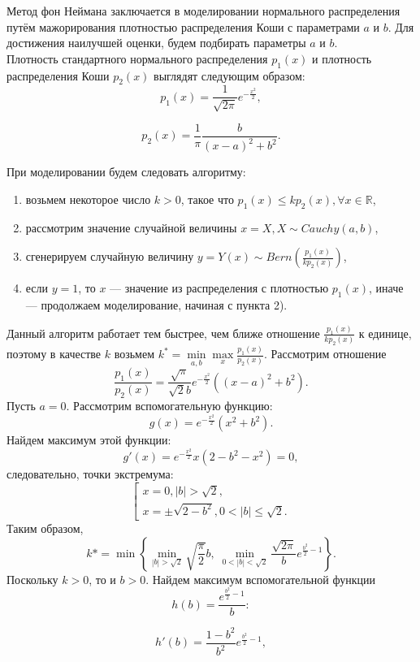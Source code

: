 Метод фон Неймана заключается в моделировании нормального распределения путём
 мажорирования плотностью распределения Коши с параметрами $a$ и $b$. Для достижения
 наилучшей оценки, будем подбирать параметры $a$ и $b$. \\
Плотность стандартного нормального распределения $p_1(x)$ и плотность распределения
 Коши $p_2(x)$ выглядят следующим образом:
$$
    p_1(x) = \frac{1}{\sqrt{2\pi}}e^{-\frac{x^2}{2}},
$$

$$
    p_2(x) = \frac{1}{\pi}\frac{b}{(x - a)^2 + b^2}.
$$

При моделировании будем следовать алгоритму:
\begin{enumerate}
	\item возьмем некоторое число $k > 0$, такое что $p_1(x) \leq kp_2(x),
     \forall x\in \mathbb{R}$,
	\item рассмотрим значение случайной величины $x = X, X\sim Cauchy(a, b)$,
	\item сгенерируем случайную величину $y = Y(x)\sim Bern\left(\frac{p_1(x)}
     {kp_2(x)}\right)$,
	\item если $y = 1$, то $x$ --- значение из распределения с плотностью $p_1(x)$,
     иначе --- продолжаем моделирование, начиная с пункта 2).
\end{enumerate}
Данный алгоритм работает тем быстрее, чем ближе отношение $\frac{p_1(x)}{kp_2(x)}$
 к единице, поэтому в качестве $k$ возьмем $k^* = \min\limits_{a, b}
 \max\limits_x\frac{p_1(x)}{p_2(x)}$.
Рассмотрим отношение 
$$
    \frac{p_1(x)}{p_2(x)} = \frac{\sqrt{\pi}}{\sqrt{2}b}e^{-\frac{x^2}{2}} 
     \left((x - a)^2 + b^2\right).
$$
Пусть $a = 0$. Рассмотрим вспомогательную функцию:
$$
    g(x) = e^{-\frac{x^2}{2}} \left( x^2 + b^2 \right).
$$
Найдем максимум этой функции:
$$
    g'(x) = e^{-\frac{x^2}{2}} x \left( 2 - b^2 - x^2 \right) = 0,
$$
следовательно, точки экстремума:
$$
    \left[
    \begin{aligned}
        x = 0, |b| > \sqrt{2},\\
        x = \pm\sqrt{2 - b^2}, 0 < |b| \leq \sqrt{2}.
    \end{aligned}
    \right.
$$
Таким образом,
$$
    k* = \min \left\{ \min_{|b| > \sqrt{2}} \sqrt{\frac{\pi}{2}} b,\;
     \min_{0 < |b| < \sqrt{2}} \frac{\sqrt{2\pi}}{b}e^{\frac{b^2}{2} - 1} \right\}.
$$
Поскольку $k > 0$, то и $b > 0$. Найдем максимум вспомогательной функции
$$
    h(b) = \frac{e^{\frac{b^2}{2} - 1}}{b}:
$$

$$
    h'(b) = \frac{1-b^2}{b^2}e^{\frac{b^2}{2} - 1},
$$

